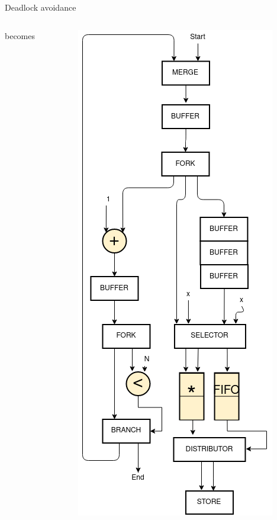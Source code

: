 \documentclass{beamer}
\begin{document}
\begin{frame}{Deadlock avoidance}
\begin{columns}[T]
\begin{column}{0.1\textwidth}
    \begin{center}
        becomes
    \end{center}
    \end{column}
    \begin{column}{0.25\textwidth}
        \begin{center}
      \includegraphics[scale=0.21]{deadlock_1.png}
    \end{center}
    \end{column}
  \end{columns}
\end{frame}

\newcommand{\deadlockAnimation}[1]{
\begin{frame}{Deadlock avoidance}
\begin{center}
\texttt{[image: \#1]}
\end{center}
\end{frame}
}
\end{document}
